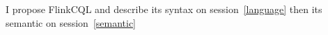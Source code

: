 I propose FlinkCQL and describe its syntax on session~\ref{language} then its semantic  on session~\ref{semantic}













	
